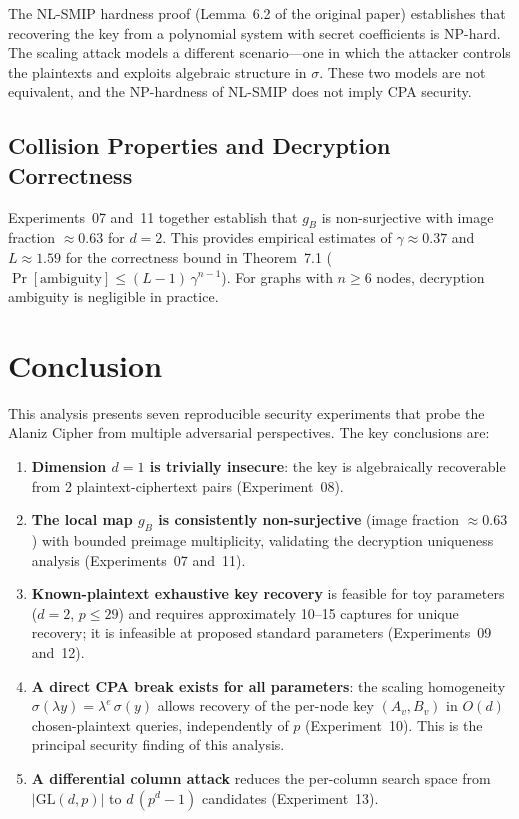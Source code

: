 \documentclass[12pt,a4paper]{article}
\theoremstyle{definition}
\newcommand{\GL}{\mathrm{GL}}
\begin{document}
The NL-SMIP hardness proof (Lemma~6.2 of the original paper)
establishes that recovering the key from a polynomial system with
secret coefficients is NP-hard. The scaling attack models a different
scenario---one in which the attacker controls the plaintexts and
exploits algebraic structure in $\sigma$. These two models are not
equivalent, and the NP-hardness of NL-SMIP does not imply CPA
security.

\subsection{Collision Properties and Decryption Correctness}

Experiments~07 and~11 together establish that $g_B$ is
non-surjective with image fraction $\approx 0.63$ for $d = 2$.
This provides empirical estimates of $\gamma \approx 0.37$ and
$L \approx 1.59$ for the correctness bound in Theorem~7.1
($\Pr[\text{ambiguity}] \leq (L-1)\,\gamma^{n-1}$). For graphs with
$n \geq 6$ nodes, decryption ambiguity is negligible in practice.

\section{Conclusion}

This analysis presents seven reproducible security experiments that
probe the Alaniz Cipher from multiple adversarial perspectives.
The key conclusions are:

\begin{enumerate}
  \item \textbf{Dimension $d = 1$ is trivially insecure}: the key is
    algebraically recoverable from 2 plaintext-ciphertext pairs
    (Experiment~08).

  \item \textbf{The local map $g_B$ is consistently non-surjective}
    (image fraction $\approx 0.63$) with bounded preimage
    multiplicity, validating the decryption uniqueness analysis
    (Experiments~07 and~11).

  \item \textbf{Known-plaintext exhaustive key recovery} is feasible
    for toy parameters ($d = 2$, $p \leq 29$) and requires
    approximately 10--15 captures for unique recovery; it is
    infeasible at proposed standard parameters (Experiments~09
    and~12).

  \item \textbf{A direct CPA break exists for all parameters}: the
    scaling homogeneity $\sigma(\lambda y) = \lambda^e\,\sigma(y)$
    allows recovery of the per-node key $(A_v, B_v)$ in $O(d)$
    chosen-plaintext queries, independently of $p$ (Experiment~10).
    This is the principal security finding of this analysis.

  \item \textbf{A differential column attack} reduces the per-column
    search space from $|\GL(d,p)|$ to $d\,(p^d - 1)$ candidates
    (Experiment~13).
\end{enumerate}
\end{document}
